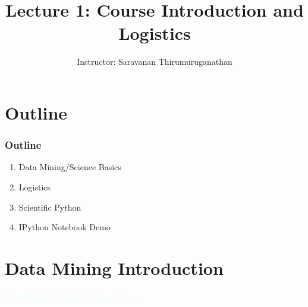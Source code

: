 \documentclass{beamer}
\title[Saravanan Thirumuruganathan] 
{Lecture 1: Course Introduction and Logistics}
\author[CSE 5334] 
{Instructor: Saravanan Thirumuruganathan}
\date[]
\newcommand{\thblue}[1]{{\Huge {\textcolor{azure}{#1}}}}
\begin{document}
\begin{frame}
  \titlepage
\end{frame}


\section{Outline}

\begin{frame}
\frametitle {Outline}
\begin{enumerate}
\item Data Mining/Science Basics
\item Logistics
\item Scientific Python
\item IPython Notebook Demo
\end{enumerate}
\end{frame}


\section{Data Mining Introduction}
\begin{frame}{}
    \begin{center}
        \thblue{Introduction To Data Mining/Science}
    \end{center}
\end{frame}
\end{document}
